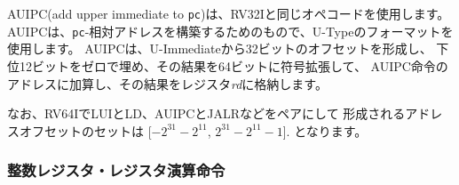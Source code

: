 \begin{comment}
AUIPC (add upper immediate to {\tt pc}) uses the same opcode as RV32I.
AUIPC is used to build {\tt
  pc}-relative addresses and uses the U-type format.  AUIPC forms a 32-bit
offset from the U-immediate, filling in the lowest 12 bits with zeros,
sign-extends the result to 64 bits,
adds it to the address of the AUIPC instruction,
then places the result in register {\em rd}.
\end{comment}

AUIPC(add upper immediate to {\tt pc})は、RV32Iと同じオペコードを使用します。
AUIPCは、{\tt pc}-相対アドレスを構築するためのもので、U-Typeのフォーマットを使用します。
AUIPCは、U-Immediateから32ビットのオフセットを形成し、
下位12ビットをゼロで埋め、その結果を64ビットに符号拡張して、
AUIPC命令のアドレスに加算し、その結果をレジスタ{\em rd}に格納します。

\begin{commentary}
\begin{comment}
Note that the set of address offsets that can be formed by pairing LUI
with LD, AUIPC with JALR, etc.\@ in RV64I is
[${-}2^{31}{-}2^{11}$, $2^{31}{-}2^{11}{-}1$].
\end{comment}
なお、RV64IでLUIとLD、AUIPCとJALRなどをペアにして
形成されるアドレスオフセットのセットは
[${-}2^{31}{-}2^{11}$, $2^{31}{-}2^{11}{-}1$].
となります。
\end{commentary}

\begin{comment}
\subsubsection*{Integer Register-Register Operations}
\end{comment}
\subsubsection*{整数レジスタ・レジスタ演算命令}

